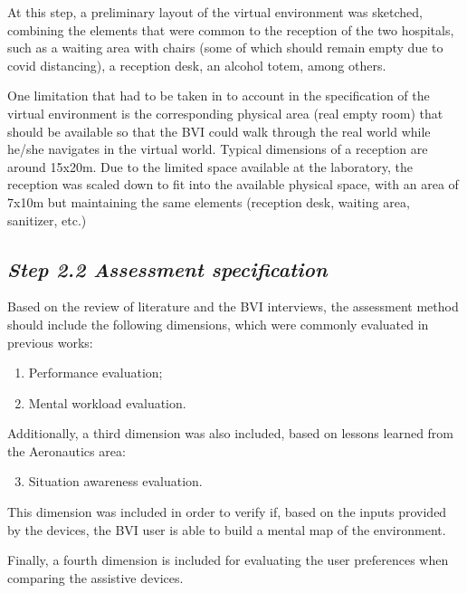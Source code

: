         At this step, a preliminary layout of the virtual environment was sketched, combining the elements that were common to the reception of the two hospitals, such as a waiting area with chairs (some of which should remain empty due to covid distancing), a reception desk, an alcohol totem, among others.

        One limitation that had to be taken in to account in the specification of the virtual environment is the corresponding physical area (real empty room) that should be available so that the BVI could walk through the real world while he/she navigates in the virtual world. Typical dimensions of a reception are around 15x20m. Due to the limited space available at the laboratory, the reception was scaled down to fit into the available physical space, with an area of 7x10m but maintaining the same elements (reception desk, waiting area, sanitizer, etc.)
    

    \subsection*{\textit{Step 2.2 Assessment specification}}
        Based on the review of literature and the BVI interviews, the assessment method should include the following dimensions, which were commonly evaluated in previous works: 

        \begin{enumerate} [label = \Alph*)]
            \item Performance evaluation;
            \item Mental workload evaluation.
        \end{enumerate}
            
        Additionally, a third dimension was also included, based on lessons learned from the Aeronautics area:   

        \begin{enumerate} [label = \Alph*)]
            \setcounter{enumi}{2}
            \item Situation awareness evaluation.
        \end{enumerate}
            
        This dimension was included in order to verify if, based on the inputs provided by the devices, the BVI user is able to build a mental map of the environment.

        Finally, a fourth dimension is included for evaluating the user preferences when comparing the assistive devices.


